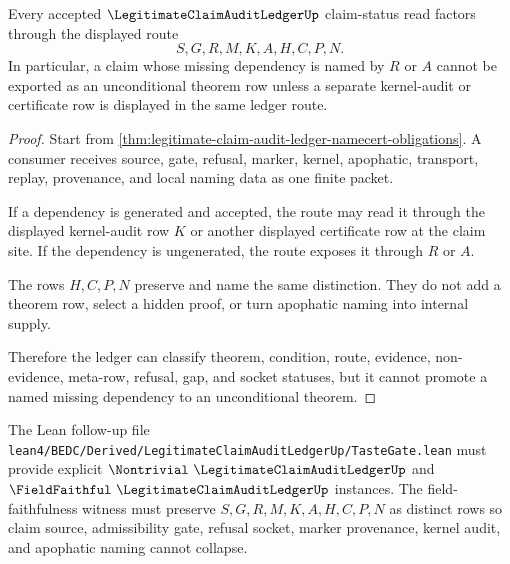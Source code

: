 \begin{theorem}
\label{thm:legitimate-claim-audit-ledger-nonescape}
Every accepted $\LegitimateClaimAuditLedgerUp$ claim-status read factors through the displayed route
$$
S,G,R,M,K,A,H,C,P,N.
$$
In particular, a claim whose missing dependency is named by $R$ or $A$ cannot be exported as an unconditional theorem row unless a separate kernel-audit or certificate row is displayed in the same ledger route.
\end{theorem}
\begin{proof}
Start from \autoref{thm:legitimate-claim-audit-ledger-namecert-obligations}. A consumer receives source, gate, refusal, marker, kernel, apophatic, transport, replay, provenance, and local naming data as one finite packet.

If a dependency is generated and accepted, the route may read it through the displayed kernel-audit row $K$ or another displayed certificate row at the claim site. If the dependency is ungenerated, the route exposes it through $R$ or $A$.

The rows $H,C,P,N$ preserve and name the same distinction. They do not add a theorem row, select a hidden proof, or turn apophatic naming into internal supply.

Therefore the ledger can classify theorem, condition, route, evidence, non-evidence, meta-row, refusal, gap, and socket statuses, but it cannot promote a named missing dependency to an unconditional theorem.
\end{proof}

The Lean follow-up file \texttt{lean4/BEDC/Derived/LegitimateClaimAuditLedgerUp/TasteGate.lean} must provide explicit $\Nontrivial\ \LegitimateClaimAuditLedgerUp$ and $\FieldFaithful\ \LegitimateClaimAuditLedgerUp$ instances. The field-faithfulness witness must preserve $S,G,R,M,K,A,H,C,P,N$ as distinct rows so claim source, admissibility gate, refusal socket, marker provenance, kernel audit, and apophatic naming cannot collapse.



